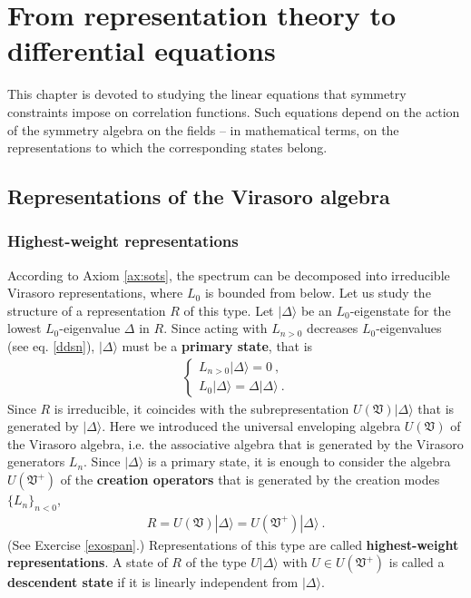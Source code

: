\documentclass[12pt, a4paper, notitlepage, twoside]{report}
\numberwithin{equation}{section}
\theoremstyle{break}
\begin{document}
\chapter{From representation theory to differential equations \label{secccs}}

This chapter is devoted to studying the linear equations that symmetry constraints impose on correlation functions.
Such equations depend on the action of the symmetry algebra on the fields -- in mathematical terms, on the representations to which the corresponding states belong. 

\section{Representations of the Virasoro algebra \label{secrep}}

\subsection{Highest-weight representations}

According to Axiom \ref{ax:sots}, the spectrum can be decomposed into irreducible Virasoro representations, where $L_0$ is bounded from below. 
Let us study the structure of a representation $R$ of this type. 
Let $|\Delta\rangle$ be an $L_0$-eigenstate for the lowest $L_0$-eigenvalue $\Delta$ in $R$.
Since acting with $L_{n>0}$ decreases $L_0$-eigenvalues (see eq. \eqref{ddsn}), $|\Delta\rangle$ must be a \textbf{\boldmath primary state}, that is
\begin{align}
 \boxed{\left\{\begin{array}{l}  L_{n>0}|\Delta\rangle = 0\ , \\ L_0 |\Delta\rangle = \Delta |\Delta\rangle\ .\end{array}\right. }
\label{lvlv}
\end{align}
Since $R$ is irreducible, it coincides with the subrepresentation $U(\mathfrak{V})|\Delta\rangle$ that is generated by $|\Delta\rangle$. Here we introduced the universal enveloping algebra $U(\mathfrak{V})$ of the Virasoro algebra, i.e. the associative algebra that is generated by the Virasoro generators $L_n$.
Since $|\Delta\rangle$ is a primary state, it is enough to consider the algebra $U(\mathfrak{V}^+)$ of the \textbf{\boldmath creation operators} that is generated by the creation modes $\{L_n\}_{n<0}$, 
\begin{align}
 R = U(\mathfrak{V})|\Delta\rangle =U(\mathfrak{V}^+)|\Delta\rangle\ .
\label{ruv}
\end{align}
(See Exercise \ref{exospan}.)
Representations of this type are called \textbf{\boldmath highest-weight representations}.
A state of $R$ of the type $U|\Delta\rangle$ with $U\in U(\mathfrak{V}^+)$ is called a \textbf{\boldmath descendent state} if it is linearly independent from $|\Delta\rangle$.
\end{document}
